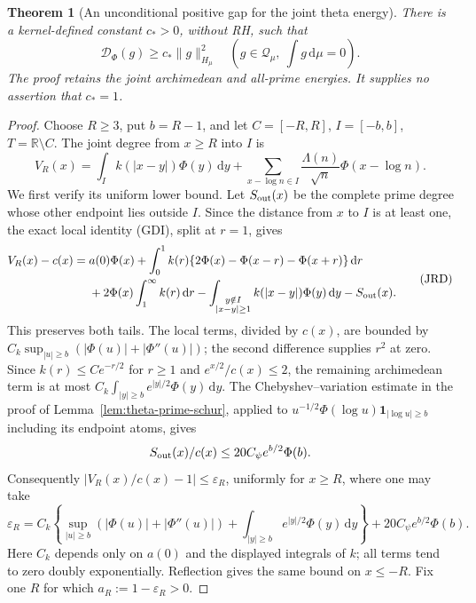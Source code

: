 \documentclass[11pt]{article}
\newtheorem{theorem}{Theorem}
\theoremstyle{remark}\newtheorem{remark}[theorem]{Remark}
\newcommand{\R}{\mathbb R}
\newcommand{\dd}{\,\mathrm d}
\begin{document}
\begin{theorem}[An unconditional positive gap for the joint theta energy]
\label{thm:theta-positive-gap}
There is a kernel-defined constant $c_*>0$, without RH, such that
\[
 \mathcal D_\Phi(g)\ge c_*\|g\|_{H_\mu}^2
 \quad\left(g\in\mathcal Q_\mu,\ \int g\dd\mu=0\right).
                                                               \tag{JPG}
\]
The proof retains the joint archimedean and all-prime energies.
It supplies no assertion that $c_*=1$.
\end{theorem}
\begin{proof}
Choose $R\ge3$, put $b=R-1$, and let
$C=[-R,R]$, $I=[-b,b]$, $T=\R\setminus C$.
The joint degree from $x\ge R$ into $I$ is
\[
 V_R(x)=\int_I k(|x-y|)\Phi(y)\dd y
   +\sum_{x-\log n\in I}\frac{\Lambda(n)}{\sqrt n}
                                        \Phi(x-\log n).
\]
We first verify its uniform lower bound. Let $S_{\rm out}(x)$
be the complete prime degree whose other endpoint lies outside
$I$. Since the distance from $x$ to $I$ is at least one,
the exact local identity (GDI), split at $r=1$, gives
\[
\begin{split}
 V_R(x)-c(x)={}&a(0)\Phi(x)
 +\int_0^1k(r)\{2\Phi(x)-\Phi(x-r)-\Phi(x+r)\}\dd r\\
 &+2\Phi(x)\int_1^\infty k(r)\dd r
 -\int_{\substack{y\notin I\\|x-y|\ge1}}
                         k(|x-y|)\Phi(y)\dd y-S_{\rm out}(x).
\end{split}                                                    \tag{JRD}
\]
This preserves both tails. The local terms, divided by $c(x)$,
are bounded by $C_k\sup_{|u|\ge b}(|\Phi(u)|+|\Phi''(u)|)$;
the second difference supplies $r^2$ at zero.
Since $k(r)\le Ce^{-r/2}$ for $r\ge1$ and
$e^{x/2}/c(x)\le2$, the remaining archimedean term is at most
$C_k\int_{|y|\ge b}e^{|y|/2}\Phi(y)\dd y$.
The Chebyshev--variation estimate in the proof of
Lemma~\ref{lem:theta-prime-schur}, applied to
$u^{-1/2}\Phi(\log u)\mathbf1_{|\log u|\ge b}$ including
its endpoint atoms, gives
\[
 S_{\rm out}(x)/c(x)\le20C_\psi e^{b/2}\Phi(b).
\]
Consequently $|V_R(x)/c(x)-1|\le\varepsilon_R$, uniformly
for $x\ge R$, where one may take
\[
 \varepsilon_R=C_k\left\{
    \sup_{|u|\ge b}(|\Phi(u)|+|\Phi''(u)|)
     +\int_{|y|\ge b}e^{|y|/2}\Phi(y)\dd y\right\}
       +20C_\psi e^{b/2}\Phi(b).
\]
Here $C_k$ depends only on $a(0)$ and the displayed integrals
of $k$; all terms tend to zero doubly exponentially.
Reflection gives the same bound on $x\le-R$.
Fix one $R$ for which $a_R:=1-\varepsilon_R>0$.


\end{proof}
\end{document}
